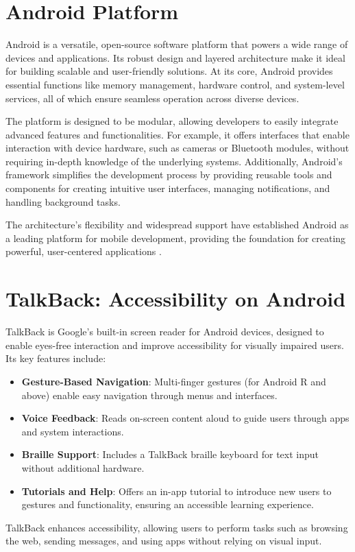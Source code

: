 \section{Android Platform}
Android is a versatile, open-source software platform that powers a wide range of devices and applications. Its robust design and layered architecture make it ideal for building scalable and user-friendly solutions. At its core, Android provides essential functions like memory management, hardware control, and system-level services, all of which ensure seamless operation across diverse devices.

The platform is designed to be modular, allowing developers to easily integrate advanced features and functionalities. For example, it offers interfaces that enable interaction with device hardware, such as cameras or Bluetooth modules, without requiring in-depth knowledge of the underlying systems. Additionally, Android's framework simplifies the development process by providing reusable tools and components for creating intuitive user interfaces, managing notifications, and handling background tasks.

The architecture’s flexibility and widespread support have established Android as a leading platform for mobile development, providing the foundation for creating powerful, user-centered applications \cite{AndroidWebsite}.

\section{TalkBack: Accessibility on Android}

TalkBack is Google’s built-in screen reader for Android devices, designed to enable eyes-free interaction and improve accessibility for visually impaired users. Its key features include:

\begin{itemize}
	\item \textbf{Gesture-Based Navigation}: Multi-finger gestures (for Android R and above) enable easy navigation through menus and interfaces.
	\item \textbf{Voice Feedback}: Reads on-screen content aloud to guide users through apps and system interactions.
	\item \textbf{Braille Support}: Includes a TalkBack braille keyboard for text input without additional hardware.
	\item \textbf{Tutorials and Help}: Offers an in-app tutorial to introduce new users to gestures and functionality, ensuring an accessible learning experience.
\end{itemize}

TalkBack enhances accessibility, allowing users to perform tasks such as browsing the web, sending messages, and using apps without relying on visual input. \cite{GoogleTalkBack}


